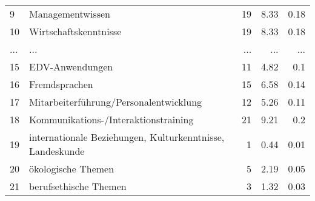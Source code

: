 \begin{longtable}{lXrrr}
        9 & \multicolumn{1}{X}{Managementwissen} & %
          \num{19} &
          \num[round-mode=places,round-precision=2]{8.33} &
          \num[round-mode=places,round-precision=2]{0.18} \\
        10 & \multicolumn{1}{X}{Wirtschaftskenntnisse} & %
          \num{19} &
          \num[round-mode=places,round-precision=2]{8.33} &
          \num[round-mode=places,round-precision=2]{0.18} \\
       ... & ... & ... & ... & ... \\
        15 & \multicolumn{1}{X}{EDV-Anwendungen} & %
          \num{11} &
          \num[round-mode=places,round-precision=2]{4.82} &
          \num[round-mode=places,round-precision=2]{0.1} \\

        16 & \multicolumn{1}{X}{Fremdsprachen} & %
          \num{15} &
          \num[round-mode=places,round-precision=2]{6.58} &
          \num[round-mode=places,round-precision=2]{0.14} \\

        17 & \multicolumn{1}{X}{Mitarbeiterführung/Personalentwicklung} & %
          \num{12} &
          \num[round-mode=places,round-precision=2]{5.26} &
          \num[round-mode=places,round-precision=2]{0.11} \\

        18 & \multicolumn{1}{X}{Kommunikations-/Interaktionstraining} & %
          \num{21} &
          \num[round-mode=places,round-precision=2]{9.21} &
          \num[round-mode=places,round-precision=2]{0.2} \\

        19 & \multicolumn{1}{X}{internationale Beziehungen, Kulturkenntnisse, Landeskunde} & %
          \num{1} &
          \num[round-mode=places,round-precision=2]{0.44} &
          \num[round-mode=places,round-precision=2]{0.01} \\

        20 & \multicolumn{1}{X}{ökologische Themen} & %
          \num{5} &
          \num[round-mode=places,round-precision=2]{2.19} &
          \num[round-mode=places,round-precision=2]{0.05} \\

        21 & \multicolumn{1}{X}{berufsethische Themen} & %
          \num{3} &
          \num[round-mode=places,round-precision=2]{1.32} &
          \num[round-mode=places,round-precision=2]{0.03} \\


\end{longtable}
